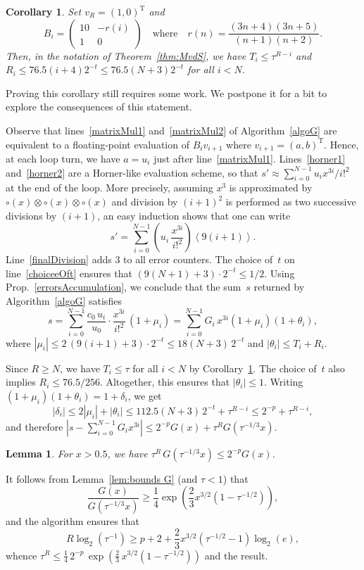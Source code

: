 \documentclass[10pt, conference]{IEEEtran}
\newcommand{\ttarget}{p}
\newcommand{\twork}{t}
\newcommand{\rnd}[1]{\left\langle #1 \right\rangle}
\newcommand{\transp}[1]{#1^{\operatorname T}}
\newtheorem{corollary}{Corollary}
\newtheorem{lemma}{Lemma}
\begin{document}
\begin{corollary}
\label{cor:MvdS to our case}
Set $v_R = \transp{(1, 0)}$ and
\[B_i = 
  \begin{pmatrix}
    10 & -r(i)\\
    1  & 0
  \end{pmatrix}
  \quad
  \text{where}
  \quad
  r(n) = \frac{(3n+4)(3n+5)}{(n+1)(n+2)}.
  \]
Then, in the notation of Theorem~\ref{thm:MvdS}, we have
$T_i \le \tau^{R-i}$ and $R_i \le 76.5(i+4)2^{-\twork} \le 76.5(N+3)2^{-\twork}$
for all $i <N$.
\end{corollary}

Proving this corollary still requires some work. We postpone it for a bit to explore the consequences of this statement.

Observe that lines~\ref{matrixMul1} and~\ref{matrixMul2} of Algorithm~\ref{algoG} are equivalent to a floating-point evaluation of $B_i v_{i+1}$ where $v_{i+1} = \transp{(a, b)}$. Hence, at each loop turn, we have $a = u_i$ just after line~\ref{matrixMul1}. Lines~\ref{horner1} and~\ref{horner2} are a Horner-like evaluation scheme, so that $s' \approx \sum_{i=0}^{N-1} u_i x^{3i}/i!^2$ at the end of the loop. More precisely, assuming $x^3$ is approximated by $\circ(x) \otimes \circ(x) \otimes \circ(x)$ and division by $(i+1)^2$ is performed as two successive divisions by $(i+1)$, an easy induction shows that one can write
\[ s' = \sum_{i=0}^{N-1} \left(u_i \,\frac{x^{3i}}{i!^2}\right)\rnd{9(i+1)}. \]
Line~\ref{finalDivision} adds $3$ to all error counters. The choice of~$\twork$ on line~\ref{choiceeOft} ensures that $(9(N+1)+3)\cdot2^{-t}\leq1/2$.  Using Prop.~\ref{errorsAccumulation}, we conclude that the sum~$s$ returned by Algorithm~\ref{algoG} satisfies
\[ s = \sum_{i=0}^{N-1} \frac{c_0\,u_i}{u_0} \cdot \frac{x^{3i}}{i!^2}\,(1+\mu_i) = \sum_{i=0}^{N-1} G_i\,x^{3i}(1+\mu_i)(1+\theta_i), \]
where $|\mu_i| \le 2 \, (9(i+1)+3) \cdot 2^{-\twork} \le 18(N+3)\,2^{-\twork}$ and $|\theta_i| \le T_i + R_i.$

Since $R \ge N$, we have $T_i \le \tau$ for all $i < N$ by Corollary~\ref{cor:MvdS to our case}. The choice of~$\twork$ also implies $R_i \le 76.5/256$. Altogether, this ensures that $|\theta_i| \le 1$. Writing $(1+\mu_i)(1+\theta_i) = 1+\delta_i$, we get 
\[ |\delta_i| \le 2|\mu_i| + |\theta_i| \le 112.5(N+3)\,2^{-\twork} + \tau^{R-i}
   \le 2^{-\ttarget} + \tau^{R-i},
\]
and therefore
$ \left|s - \sum_{i=0}^{N-1} G_i x^{3i}\right| \le 2^{-\ttarget} G(x) + \tau^{R} G(\tau^{-1/3} x)$.
\begin{lemma}
    For $x > 0.5$, we have $\tau^R\, G(\tau^{-1/3}x) \le 2^{-\ttarget}G(x)$.
\end{lemma}
\begin{IEEEproof}
  It follows from Lemma~\ref{lem:bounds G} (and $\tau < 1$) that
    \[ \frac{G(x)}{G(\tau^{-1/3} x)}
        \ge
        \frac14 \exp\left(\frac{2}{3} x^{3/2} (1-\tau^{-1/2}) \right),
    \]
    and the algorithm ensures that 
    \[ R \log_2 (\tau^{-1}) \ge \ttarget + 2 + \frac23 x^{3/2}(\tau^{-1/2}-1) \log_2(e), \]
    whence $\tau^{R} \le \frac{1}{4} \, 2^{-\ttarget} \, \exp(\frac{2}{3}\,x^{3/2}(1-\tau^{-1/2}))$ and the result.
\end{IEEEproof}
\end{document}
